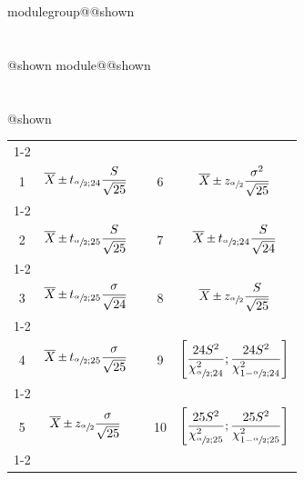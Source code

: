 \documentclass{Evaluation}
\makeatletter
\newcommand{\currentmodulekey}{}
\newcommand{\currentmoduletitle}{}
\newcommand{\currentgroupkey}{}
\newcommand{\currentgrouptitle}{}
\newcommand{\showmoduleifneeded}{%
  \ifx\currentgroupkey\empty\else
    \expandafter\ifx\csname modulegroup@\currentgroupkey @shown\endcsname\relax
      \section*{\currentgrouptitle}%
      \expandafter\gdef\csname modulegroup@\currentgroupkey @shown\endcsname{1}%
    \fi
  \fi
  \expandafter\ifx\csname module@\currentmodulekey @shown\endcsname\relax
    \section*{\currentmoduletitle}%
    \expandafter\gdef\csname module@\currentmodulekey @shown\endcsname{1}%
  \fi
}
\newenvironment{H24}{\showmoduleifneeded}{}
\makeatother
\begin{document}
\begin{questions}
\begin{H24}
\begin{center}
\begin{tabular}{|c|c|c|c|c|}
	\cline{1-2}\cline{4-5}
	&&&&\\[-3mm]
	1 &  $\displaystyle \overline {X}\Mypm t_{\sfrac{\alpha}{2};24}\frac{S}{\sqrt{25}}$
	 & \hspace{0.3cm} &
	 6 &  $\displaystyle \overline {X}\Mypm z_{\sfrac{\alpha}{2}}\frac{\sigma^2}{\sqrt{25}}$
	\\[4mm]
	\cline{1-2}\cline{4-5}
	&&&&\\[-3mm]
	 2 & $\displaystyle \overline {X}\Mypm t_{\sfrac{\alpha}{2};25}\frac{S}{\sqrt{25}}$
	&  &
	 7 & $\displaystyle \overline {X}\Mypm t_{\sfrac{\alpha}{2};24}\frac{S}{\sqrt{24}}$ 
	\\[4mm]
	\cline{1-2}\cline{4-5}
	&&&&\\[-3mm]
	 3 & $\displaystyle \overline {X}\Mypm t_{\sfrac{\alpha}{2};25}\frac{\sigma}{\sqrt{24}}$
	 &  &
	  8 & $\displaystyle \overline {X}\Mypm z_{\sfrac{\alpha}{2}}\frac{S}{\sqrt{25}}$
	 \\[4mm]
	 \cline{1-2}\cline{4-5}
	 &&&&\\[-3mm]
	   4 & $\displaystyle \overline {X}\Mypm t_{\sfrac{\alpha}{2};25}\frac{\sigma}{\sqrt{25}}$
	 &  &
	  9 & $\displaystyle \left[\frac{24S^2}{\chi_{\sfrac{\alpha}{2};24}^2};\frac{24S^2}{\chi_{1-\sfrac{\alpha}{2};24}^2}\right]$
	 \\[5mm]
	 \cline{1-2}\cline{4-5}
	 &&&&\\[-3mm]
	  5 & $\displaystyle \overline {X}\Mypm z_{\sfrac{\alpha}{2}}\frac{\sigma}{\sqrt{25}}$
	 &  &
	  10 & $\displaystyle \left[\frac{25S^2}{\chi_{\sfrac{\alpha}{2};25}^2};\frac{25S^2}{\chi_{1-\sfrac{\alpha}{2};25}^2}\right]$
	 \\[5mm]
	 \cline{1-2}\cline{4-5}

	
\end{tabular}

\end{center}


\end{H24}
\end{questions}
\end{document}
